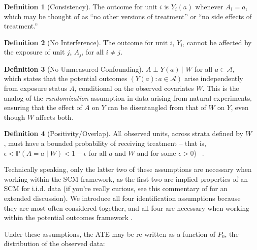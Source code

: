 \documentclass[
  12pt, krantz2,
]{krantz}
\renewcommand{\P}{\mathbb{P}}
\newcommand{\1}{\mathbbm{1}}
\theoremstyle{definition}
\newtheorem{definition}{Definition}[chapter]
\theoremstyle{definition}
\theoremstyle{definition}
\theoremstyle{definition}
\theoremstyle{remark}
\begin{document}
\begin{definition}[Consistency]
\protect\hypertarget{def:consist-ass}{}\label{def:consist-ass}The outcome for unit \(i\) is \(Y_i(a)\) whenever \(A_i = a\), which may be thought of
as ``no other versions of treatment'' or ``no side effects of treatment.''
\end{definition}

\begin{definition}[No Interference]
\protect\hypertarget{def:interf-ass}{}\label{def:interf-ass}The outcome for unit \(i\), \(Y_i\), cannot be affected by the exposure of unit \(j\),
\(A_j\), for all \(i \neq j\).
\end{definition}

\begin{definition}[No Unmeasured Confounding]
\protect\hypertarget{def:noconf-ass}{}\label{def:noconf-ass}\(A \perp Y(a) \mid W\) for all \(a \in \mathcal{A}\), which states that the
potential outcomes \((Y(a) : a \in \mathcal{A})\) arise independently from
exposure status \(A\), conditional on the observed covariates \(W\). This is the
analog of the \emph{randomization} assumption in data arising from natural
experiments, ensuring that the effect of \(A\) on \(Y\) can be disentangled from
that of \(W\) on \(Y\), even though \(W\) affects both.
\end{definition}

\begin{definition}[Positivity/Overlap]
\protect\hypertarget{def:posit-ass}{}\label{def:posit-ass}All observed units, across strata defined by \(W\), must have a bounded
probability of receiving treatment -- that is, \(\epsilon < \P(A = a \mid W) < 1 - \epsilon\) for all \(a\) and \(W\) and for some \(\epsilon > 0\)) ~.
\end{definition}

Technically speaking, only the latter two of these assumptions are necessary
when working within the SCM framework, as the first two are implied properties
of an SCM for i.i.d. data (if you're really curious, see this commentary of
\citet{pearl2010brief} for an extended discussion). We introduce all four
identification assumptions because they are most often considered together, and
all four are necessary when working within the potential outcomes framework
\citep{rubin2005causal, imbens2015causal}.

Under these assumptions, the ATE may be re-written as a function of \(P_0\), the
distribution of the observed data:
\end{document}
